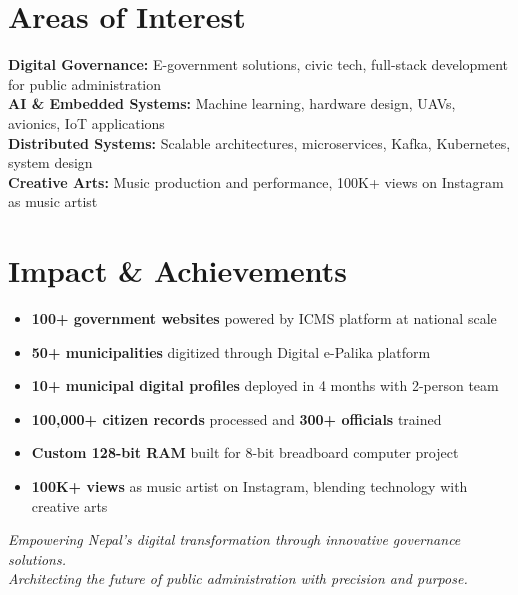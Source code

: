 \documentclass[11pt,a4paper]{article}
\begin{document}
\section*{Areas of Interest}

\textbf{Digital Governance:} E-government solutions, civic tech, full-stack development for public administration\\
\textbf{AI \& Embedded Systems:} Machine learning, hardware design, UAVs, avionics, IoT applications\\
\textbf{Distributed Systems:} Scalable architectures, microservices, Kafka, Kubernetes, system design\\
\textbf{Creative Arts:} Music production and performance, 100K+ views on Instagram as music artist

\section*{Impact \& Achievements}

\begin{itemize}[leftmargin=*, itemsep=2pt, topsep=4pt]
    \item \textbf{100+ government websites} powered by ICMS platform at national scale
    \item \textbf{50+ municipalities} digitized through Digital e-Palika platform
    \item \textbf{10+ municipal digital profiles} deployed in 4 months with 2-person team
    \item \textbf{100,000+ citizen records} processed and \textbf{300+ officials} trained
    \item \textbf{Custom 128-bit RAM} built for 8-bit breadboard computer project
    \item \textbf{100K+ views} as music artist on Instagram, blending technology with creative arts
\end{itemize}

\vfill
\begin{center}
\textit{Empowering Nepal's digital transformation through innovative governance solutions.\\
Architecting the future of public administration with precision and purpose.}
\end{center}
\end{document}
